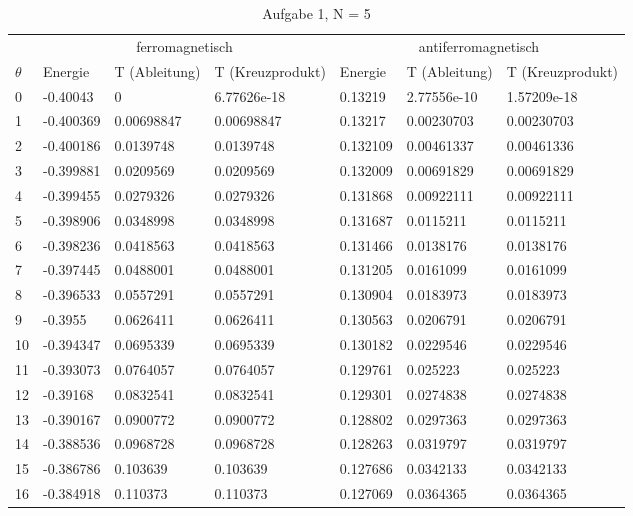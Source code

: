 \begin{longtable}{l|lll|lll}
\caption[]{Aufgabe 1, N = 5}\\
\hline\hline
& \multicolumn{3}{c}{ferromagnetisch} & \multicolumn{3}{c}{antiferromagnetisch} \\
$\theta$ & Energie & T (Ableitung) & T (Kreuzprodukt) & Energie & T (Ableitung) & T (Kreuzprodukt) \\
\hline
\endhead
\hline
   0 & -0.40043     & 0           & 6.77626e-18 &  0.13219     & 2.77556e-10 & 1.57209e-18 \\
   1 & -0.400369    & 0.00698847  & 0.00698847  &  0.13217     & 0.00230703  & 0.00230703  \\
   2 & -0.400186    & 0.0139748   & 0.0139748   &  0.132109    & 0.00461337  & 0.00461336  \\
   3 & -0.399881    & 0.0209569   & 0.0209569   &  0.132009    & 0.00691829  & 0.00691829  \\
   4 & -0.399455    & 0.0279326   & 0.0279326   &  0.131868    & 0.00922111  & 0.00922111  \\
   5 & -0.398906    & 0.0348998   & 0.0348998   &  0.131687    & 0.0115211   & 0.0115211   \\
   6 & -0.398236    & 0.0418563   & 0.0418563   &  0.131466    & 0.0138176   & 0.0138176   \\
   7 & -0.397445    & 0.0488001   & 0.0488001   &  0.131205    & 0.0161099   & 0.0161099   \\
   8 & -0.396533    & 0.0557291   & 0.0557291   &  0.130904    & 0.0183973   & 0.0183973   \\
   9 & -0.3955      & 0.0626411   & 0.0626411   &  0.130563    & 0.0206791   & 0.0206791   \\
  10 & -0.394347    & 0.0695339   & 0.0695339   &  0.130182    & 0.0229546   & 0.0229546   \\
  11 & -0.393073    & 0.0764057   & 0.0764057   &  0.129761    & 0.025223    & 0.025223    \\
  12 & -0.39168     & 0.0832541   & 0.0832541   &  0.129301    & 0.0274838   & 0.0274838   \\
  13 & -0.390167    & 0.0900772   & 0.0900772   &  0.128802    & 0.0297363   & 0.0297363   \\
  14 & -0.388536    & 0.0968728   & 0.0968728   &  0.128263    & 0.0319797   & 0.0319797   \\
  15 & -0.386786    & 0.103639    & 0.103639    &  0.127686    & 0.0342133   & 0.0342133   \\
  16 & -0.384918    & 0.110373    & 0.110373    &  0.127069    & 0.0364365   & 0.0364365   \\

\end{longtable}

